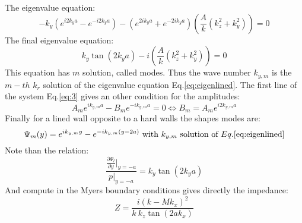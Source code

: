 The eigenvalue equation:
\begin{equation}
    -k_y(e^{i2k_ya}-e^{-i2k_ya})-(e^{2ik_ya}+e^{-2ik_ya})(\frac{A}{k}(k_z^2+k_y^2))=0
\end{equation}
The final eigenvalue equation:
\begin{equation} \label{eq:eigenlined}
    k_y\tan(2k_ya) -i(\frac{A}{k}(k_z^2+k_y^2))=0
\end{equation}
This equation has $m$ solution, called modes. Thus the wave number $k_{y,m}$ is the $m-th$ $k_r$ solution of the eigenvalue equation Eq.\eqref{eq:eigenlined}. 
The first line of the system Eq.\eqref{eq:3} gives an other condition for the amplitudes:
\begin{equation}
    A_me^{ik_{y,m}a}-B_me^{-ik_{y,m}a}=0 \iff  B_m=A_me^{i2k_{y,m}a}
\end{equation}
Finally for a lined wall opposite to a hard walls the shapes modes are: 
\begin{equation}
    \Psi_{m}(y)=e^{ik_{y,m}y}-e^{-ik_{y,m}(y-2a)}\ \text{with}\ k_{y,m} \ \text{solution of} \ Eq.\eqref{eq:eigenlined}
\end{equation}
Note than the relation:
\begin{equation}
   \frac{\frac{\partial\Psi_{l}}{\partial y}|_{y=-a}}{p|_{y=-a}}=k_y\tan(2k_ya)
\end{equation}
And compute in the Myers boundary conditions gives directly the impedance:
\begin{equation}\label{eq:Impedance}
   Z=\frac{i(k-Mk_x)^2}{k\ k_z\tan(2ak_x)}
\end{equation}
